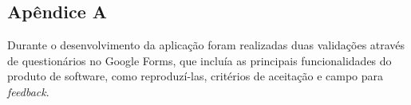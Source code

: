 \begin{apendicesenv}

\partapendices

\chapter{Apêndice A}
\label{ApendiceA}

Durante o desenvolvimento da aplicação foram realizadas duas validações através de questionários no Google Forms,
que incluía as principais funcionalidades do produto de software, como reproduzí-las, critérios de aceitação e campo para 
\textit{feedback}. 

\end{apendicesenv}
